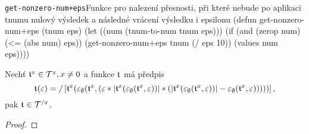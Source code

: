 \begin{lispcode}{\texttt{get-nonzero-num+eps}}{Funkce pro nalezení přesnosti, při které nebude po aplikaci tnumu nulový výsledek a následné vrácení výsledku i epsilonu}
(\textcolor{funkcionalni}{defun} \textcolor{pojmenovan}{get-nonzero-num+eps} (tnum eps)
  (\textcolor{vedlejsi}{let} ((num (\textcolor{moje}{tnum-to-num} tnum eps)))
    (\textcolor{funkcionalni}{if} (\textcolor{funkcionalni}{and} (\textcolor{funkcionalni}{zerop} num) (\textcolor{matematicke}{<=} (\textcolor{matematicke}{abs} num) eps))
      (\textcolor{moje}{get-nonzero-num+eps} tnum (\textcolor{matematicke}{/} eps 10))
      (\textcolor{matematicke}{values} num eps))))
\end{lispcode}

\begin{theorem}\label{hyp:prevraceni_tnumu}
Nechť $\mathfrak{t}^{x}\in\mathcal{T}^{x},x\neq 0$ a funkce $\mathfrak{t}^{}$ má předpis
\begin{equation}
\mathfrak{t}^{}(\varepsilon)=/\left[\mathfrak{t}^{x}(\varepsilon_\emptyset(\mathfrak{t}^{x}, (\varepsilon*|\mathfrak{t}^{x}(\varepsilon_\emptyset(\mathfrak{t}^{x}, \varepsilon))|*(|\mathfrak{t}^{x}(\varepsilon_\emptyset(\mathfrak{t}^{x}, \varepsilon))|-\varepsilon_\emptyset(\mathfrak{t}^{x}, \varepsilon)))))\right],
\end{equation}
pak $\mathfrak{t}^{}\in\mathcal{T}^{/x}$.
\begin{proof}


\end{proof}
\end{theorem}
